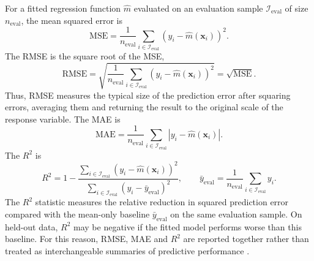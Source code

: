   \noindent
  For a fitted regression function \(\widehat{m}\) evaluated on an evaluation
  sample \(\mathcal{I}_{\mathrm{eval}}\) of size \(n_{\mathrm{eval}}\), the mean
  squared error is
  \begin{equation}
  \label{eq:mse}
      \mathrm{MSE}
      =
      \frac{1}{n_{\mathrm{eval}}}
      \sum_{i\in\mathcal{I}_{\mathrm{eval}}}
      \left(
          y_i - \widehat{m}(\mathbf{x}_i)
      \right)^{2}.
  \end{equation}
  The RMSE is the square root of the MSE,
  \begin{equation}
  \label{eq:rmse}
      \mathrm{RMSE}
      =
      \sqrt{
          \frac{1}{n_{\mathrm{eval}}}
          \sum_{i\in\mathcal{I}_{\mathrm{eval}}}
          \left(
              y_i - \widehat{m}(\mathbf{x}_i)
          \right)^{2}
      }
      =
      \sqrt{\mathrm{MSE}}.
  \end{equation}
  Thus, RMSE measures the typical size of the prediction error after
  squaring errors, averaging them and returning the result to the original scale
  of the response variable. The MAE is
  \begin{equation}
  \label{eq:mae}
      \mathrm{MAE}
      =
      \frac{1}{n_{\mathrm{eval}}}
      \sum_{i\in\mathcal{I}_{\mathrm{eval}}}
      \left|
          y_i - \widehat{m}(\mathbf{x}_i)
      \right|.
  \end{equation}
  The \ensuremath{R^2} is
  \begin{equation}
  \label{eq:r_squared}
      R^{2}
      =
      1
      -
      \frac{
          \displaystyle\sum_{i\in\mathcal{I}_{\mathrm{eval}}}
          \left(y_i - \widehat{m}(\mathbf{x}_i)\right)^{2}
      }{
          \displaystyle\sum_{i\in\mathcal{I}_{\mathrm{eval}}}
          \left(y_i - \bar{y}_{\mathrm{eval}}\right)^{2}
      },
      \qquad
      \bar{y}_{\mathrm{eval}}
      =
      \frac{1}{n_{\mathrm{eval}}}
      \sum_{i\in\mathcal{I}_{\mathrm{eval}}} y_i .
  \end{equation}
  The \(R^{2}\) statistic measures the relative reduction in squared prediction
  error compared with the mean-only baseline \(\bar{y}_{\mathrm{eval}}\) on the
  same evaluation sample. On held-out data, \(R^{2}\) may be negative if the
  fitted model performs worse than this baseline. For this reason, RMSE,
  MAE and \ensuremath{R^2} are reported together rather than treated as
  interchangeable summaries of predictive performance
  \citep{james2021introduction,hastie2009elements}.

